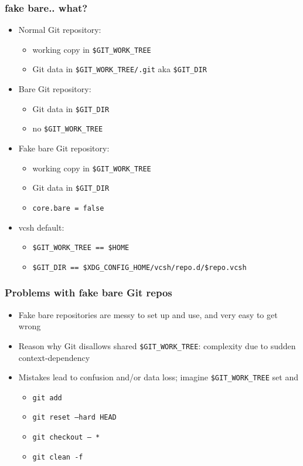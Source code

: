 \documentclass[t]{beamer}
\begin{document}
\begin{frame}
	\frametitle{fake bare.. what?}
	\begin{itemize}
		\item Normal Git repository:
		\begin{itemize}
			\item working copy in \texttt{\$GIT\_WORK\_TREE}
			\item Git data in \texttt{\$GIT\_WORK\_TREE/.git} aka \texttt{\$GIT\_DIR}
		\end{itemize}
		\item Bare Git repository:
		\begin{itemize}
			\item Git data in \texttt{\$GIT\_DIR}
			\item no  \texttt{\$GIT\_WORK\_TREE}
		\end{itemize}
		\item Fake bare Git repository:
		\begin{itemize}
			\item working copy in \texttt{\$GIT\_WORK\_TREE}
			\item Git data in \texttt{\$GIT\_DIR}
			\item \texttt{core.bare = false}
		\end{itemize}
		\item vcsh default:
		\begin{itemize}
			\item \texttt{\$GIT\_WORK\_TREE == \$HOME}
			\item \texttt{\$GIT\_DIR == \$XDG\_CONFIG\_HOME/vcsh/repo.d/\$repo.vcsh}
		\end{itemize}
	\end{itemize}
\end{frame}

\begin{frame}
	\frametitle{Problems with fake bare Git repos}
	\begin{itemize}
		\item Fake bare repositories are messy to set up and use, and very easy to get wrong
		\item Reason why Git disallows shared \texttt{\$GIT\_WORK\_TREE}: complexity due to sudden context-dependency
		\item Mistakes lead to confusion and/or data loss; imagine \texttt{\$GIT\_WORK\_TREE} set and
		\begin{itemize}
			\item \texttt{git add}
			\item \texttt{git reset --hard HEAD}
			\item \texttt{git checkout -- *}
			\item \texttt{git clean -f}
		\end{itemize}
	\end{itemize}
\end{frame}
\end{document}
